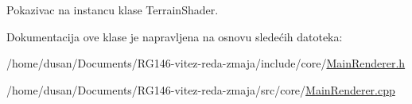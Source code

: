 Pokazivac na instancu klase Terrain\+Shader. 



Dokumentacija ove klase je napravljena na osnovu sledećih datoteka\+:\begin{DoxyCompactItemize}
\item 
/home/dusan/\+Documents/\+R\+G146-\/vitez-\/reda-\/zmaja/include/core/\hyperlink{MainRenderer_8h}{Main\+Renderer.\+h}\item 
/home/dusan/\+Documents/\+R\+G146-\/vitez-\/reda-\/zmaja/src/core/\hyperlink{MainRenderer_8cpp}{Main\+Renderer.\+cpp}\end{DoxyCompactItemize}
